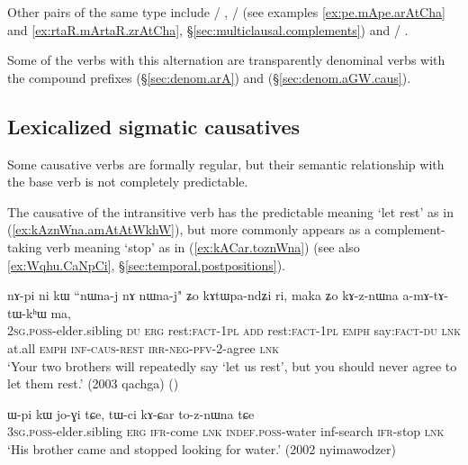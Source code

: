  Other pairs of the same type include   / ,   /  (see examples \ref{ex:pe.mApe.arAtCha} and \ref{ex:rtaR.mArtaR.zrAtCha}, §\ref{sec:multiclausal.complements}) and 	/ . 
 
 Some of the verbs with this  alternation are transparently denominal verbs with the compound prefixes  (§\ref{sec:denom.arA}) and  (§\ref{sec:denom.aGW.caus}).

 

\subsection{Lexicalized sigmatic causatives} \label{sec:sig.caus.lexicalized}
Some causative verbs are formally regular, but their semantic relationship with the base verb is not completely predictable.

The causative  of the intransitive verb  has the predictable meaning `let rest' as in (\ref{ex:kAznWna.amAtAtWkhW}), but more commonly appears as a com\-ple\-ment-taking verb meaning `stop' as in (\ref{ex:kACar.toznWna}) (see also \ref{ex:Wqhu.CaNpCi}, §\ref{sec:temporal.postpositions}).

\begin{exe} 
\ex \label{ex:kAznWna.amAtAtWkhW}
\gll nɤ-pi ni kɯ ``nɯna-j nɤ nɯna-j" ʑo kɤtɯpa-ndʑi ri, maka ʑo kɤ-z-nɯna a-mɤ-tɤ-tɯ-kʰɯ ma,\\
\textsc{2sg}.\textsc{poss}-elder.sibling \textsc{du} \textsc{erg} rest:\textsc{fact}-\textsc{1pl} \textsc{add}  rest:\textsc{fact}-\textsc{1pl} \textsc{emph} say:\textsc{fact}-\textsc{du} \textsc{lnk} at.all \textsc{emph} \textsc{inf}-\textsc{caus}-\textsc{rest} \textsc{irr}-\textsc{neg}-\textsc{pfv}-2-agree \textsc{lnk} \\
\glt `Your two brothers will repeatedly say `let us rest', but you should never agree to let them rest.' (2003 qachga)
()
\end{exe}

\begin{exe} 
\ex \label{ex:kACar.toznWna}
\gll ɯ-pi kɯ jo-ɣi tɕe, tɯ-ci kɤ-ɕar to-z-nɯna tɕe \\
\textsc{3sg}.\textsc{poss}-elder.sibling \textsc{erg} \textsc{ifr}-come \textsc{lnk} \textsc{indef}.\textsc{poss}-water inf-search \textsc{ifr}-stop \textsc{lnk} \\
\glt `His brother came and stopped looking for water.' (2002 nyimawodzer)
\end{exe}

